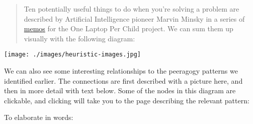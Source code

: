 \begin{quote}
Ten potentially useful things to do when you're solving a problem are
described by Artificial Intelligence pioneer Marvin Minsky in a series
of
\href{http://web.media.mit.edu/~minsky/OLPC-1.html}{m}\href{http://web.media.mit.edu/~minsky/OLPC-2.html}{e}\href{http://web.media.mit.edu/~minsky/OLPC-3.html}{m}\href{http://web.media.mit.edu/~minsky/OLPC-4.html}{o}\href{http://web.media.mit.edu/~minsky/OLPC-5.html}{s}
for the One Laptop Per Child project. We can sum them up visually with
the following diagram:
\end{quote}

\begin{center}
\texttt{[image: ./images/heuristic-images.jpg]}
\end{center}
We can also see some interesting relationships to the peeragogy patterns
we identified earlier. The connections are first described with a
picture here, and then in more detail with text below. Some of the nodes
in this diagram are clickable, and clicking will take you to the page
describing the relevant pattern:

To elaborate in words:

